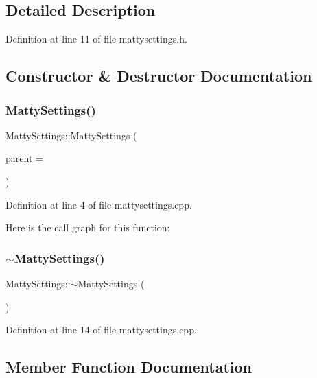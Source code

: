 \subsection{Detailed Description}


Definition at line 11 of file mattysettings.\+h.



\subsection{Constructor \& Destructor Documentation}
\hypertarget{classMattySettings_a0d5b0f74bacfcad4f084772a081294a9}{}\label{classMattySettings_a0d5b0f74bacfcad4f084772a081294a9} 
\subsubsection{\texorpdfstring{Matty\+Settings()}{MattySettings()}}
{\footnotesize\ttfamily Matty\+Settings\+::\+Matty\+Settings (\begin{DoxyParamCaption}\item[{Q\+Widget $\ast$}]{parent = {} }\end{DoxyParamCaption})}



Definition at line 4 of file mattysettings.\+cpp.

Here is the call graph for this function\+:
\hypertarget{classMattySettings_a361e58579542394627a34f07f408aa3a}{}\label{classMattySettings_a361e58579542394627a34f07f408aa3a} 
\subsubsection{\texorpdfstring{$\sim$\+Matty\+Settings()}{~MattySettings()}}
{\footnotesize\ttfamily Matty\+Settings\+::$\sim$\+Matty\+Settings (\begin{DoxyParamCaption}{ }\end{DoxyParamCaption})}



Definition at line 14 of file mattysettings.\+cpp.



\subsection{Member Function Documentation}
\hypertarget{classMattySettings_a0d151b91e1d79229d6ae0addf858c0d8}{}\label{classMattySettings_a0d151b91e1d79229d6ae0addf858c0d8} 
